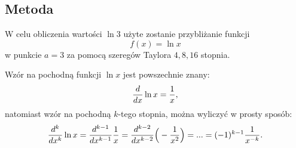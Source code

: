 \documentclass[11pt, wide]{mwart}
\begin{document}
\subsection{Metoda}

W celu obliczenia wartości $\ln3$ użyte zostanie przybliżanie funkcji
$$f(x)=\ln x$$
w punkcie $a=3$ za pomocą szeregów Taylora $4, 8, 16$ stopnia.

Wzór na pochodną funkcji $\ln x$ jest powszechnie znany:
$${d\over dx}\ln x=\frac1x,$$
natomiast wzór na pochodną $k$-tego stopnia, można wyliczyć w prosty sposób:
\begin{align}
    {d^k\over dx^k}\ln x={d^{k-1}\over dx^{k-1}}\frac1x={d^{k-2}\over dx^{k-2}}\Big(-\frac1{x^2}\Big)=...=(-1)^{k-1}\frac1{x^{-k}}.
\end{align}
\end{document}
